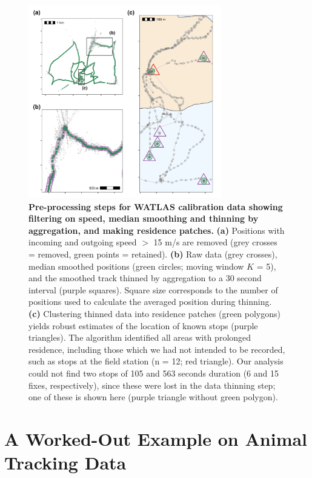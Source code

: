 \begin{figure}[h!]
    \centering
    \includegraphics[width=0.75\textwidth]{figures/preprocessing/fig_07.png}
    \caption{
        \textbf{Pre-processing steps for WATLAS calibration data showing filtering on speed, median smoothing and thinning by aggregation, and making residence patches.}
        \textbf{(a)} Positions with incoming and outgoing speed $>$ 15 m/s are removed (grey crosses = removed, green points = retained).
        \textbf{(b)} Raw data (grey crosses), median smoothed positions (green circles; moving window $K$ = 5), and the smoothed track thinned by aggregation to a 30 second interval (purple squares).
        Square size corresponds to the number of positions used to calculate the averaged position during thinning.
        \textbf{(c)} Clustering thinned data into residence patches (green polygons) yields robust estimates of the location of known stops (purple triangles).
        The algorithm identified all areas with prolonged residence, including those which we had not intended to be recorded, such as stops at the field station (n = 12; red triangle).
        Our analysis could not find two stops of 105 and 563 seconds duration (6 and 15 fixes, respectively), since these were lost in the data thinning step; one of these is shown here (purple triangle without green polygon).
    }
    \label{preproc_fig_07}
\end{figure}

\section*{A Worked-Out Example on Animal Tracking Data}

